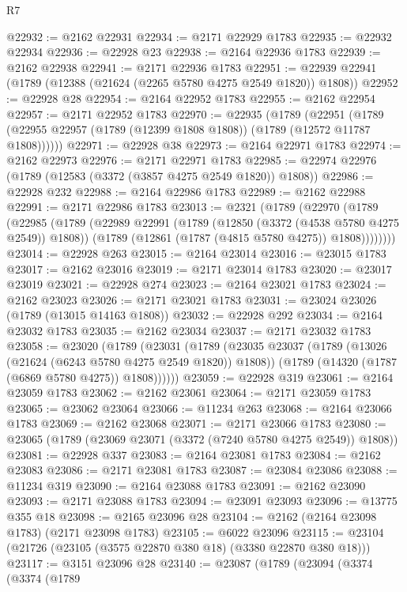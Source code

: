 \begin{lexlean}{R7}
\begin{coremodule}
@22932 := @2162 @22931
@22934 := @2171 @22929 @1783
@22935 := @22932 @22934
@22936 := @22928 @23
@22938 := @2164 @22936 @1783
@22939 := @2162 @22938
@22941 := @2171 @22936 @1783
@22951 := @22939 @22941 (@1789 (@12388 (@21624 (@2265 @5780 @4275 @2549 @1820)) @1808))
@22952 := @22928 @28
@22954 := @2164 @22952 @1783
@22955 := @2162 @22954
@22957 := @2171 @22952 @1783
@22970 := @22935
    (@1789
      (@22951 (@1789 (@22955 @22957 (@1789 (@12399 @1808 @1808)) (@1789 (@12572 @11787 @1808))))))
@22971 := @22928 @38
@22973 := @2164 @22971 @1783
@22974 := @2162 @22973
@22976 := @2171 @22971 @1783
@22985 := @22974 @22976 (@1789 (@12583 (@3372 (@3857 @4275 @2549 @1820)) @1808))
@22986 := @22928 @232
@22988 := @2164 @22986 @1783
@22989 := @2162 @22988
@22991 := @2171 @22986 @1783
@23013 := @2321
    (@1789
      (@22970
        (@1789
          (@22985
            (@1789
              (@22989
                @22991
                (@1789 (@12850 (@3372 (@4538 @5780 @4275 @2549)) @1808))
                (@1789 (@12861 (@1787 (@4815 @5780 @4275)) @1808))))))))
@23014 := @22928 @263
@23015 := @2164 @23014
@23016 := @23015 @1783
@23017 := @2162 @23016
@23019 := @2171 @23014 @1783
@23020 := @23017 @23019
@23021 := @22928 @274
@23023 := @2164 @23021 @1783
@23024 := @2162 @23023
@23026 := @2171 @23021 @1783
@23031 := @23024 @23026 (@1789 (@13015 @14163 @1808))
@23032 := @22928 @292
@23034 := @2164 @23032 @1783
@23035 := @2162 @23034
@23037 := @2171 @23032 @1783
@23058 := @23020
    (@1789
      (@23031
        (@1789
          (@23035
            @23037
            (@1789 (@13026 (@21624 (@6243 @5780 @4275 @2549 @1820)) @1808))
            (@1789 (@14320 (@1787 (@6869 @5780 @4275)) @1808))))))
@23059 := @22928 @319
@23061 := @2164 @23059 @1783
@23062 := @2162 @23061
@23064 := @2171 @23059 @1783
@23065 := @23062 @23064
@23066 := @11234 @263
@23068 := @2164 @23066 @1783
@23069 := @2162 @23068
@23071 := @2171 @23066 @1783
@23080 := @23065 (@1789 (@23069 @23071 (@3372 (@7240 @5780 @4275 @2549)) @1808))
@23081 := @22928 @337
@23083 := @2164 @23081 @1783
@23084 := @2162 @23083
@23086 := @2171 @23081 @1783
@23087 := @23084 @23086
@23088 := @11234 @319
@23090 := @2164 @23088 @1783
@23091 := @2162 @23090
@23093 := @2171 @23088 @1783
@23094 := @23091 @23093
@23096 := @13775 @355 @18
@23098 := @2165 @23096 @28
@23104 := @2162 (@2164 @23098 @1783) (@2171 @23098 @1783)
@23105 := @6022 @23096
@23115 := @23104 (@21726 (@23105 (@3575 @22870 @380 @18) (@3380 @22870 @380 @18)))
@23117 := @3151 @23096 @28
@23140 := @23087
    (@1789
      (@23094
        (@3374
          (@3374
            (@1789

\end{coremodule}
\end{lexlean}
